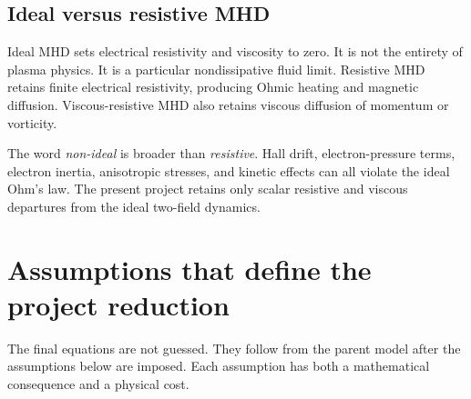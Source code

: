 \subsection{Ideal versus resistive MHD}

Ideal MHD sets electrical resistivity and viscosity to zero. It is not the entirety of plasma physics. It is a particular nondissipative fluid limit. Resistive MHD retains finite electrical resistivity, producing Ohmic heating and magnetic diffusion. Viscous-resistive MHD also retains viscous diffusion of momentum or vorticity.

The word \emph{non-ideal} is broader than \emph{resistive}. Hall drift, electron-pressure terms, electron inertia, anisotropic stresses, and kinetic effects can all violate the ideal Ohm's law. The present project retains only scalar resistive and viscous departures from the ideal two-field dynamics.

\section{Assumptions that define the project reduction}
\label{sec:reduction}

The final equations are not guessed. They follow from the parent model after the assumptions below are imposed. Each assumption has both a mathematical consequence and a physical cost.

